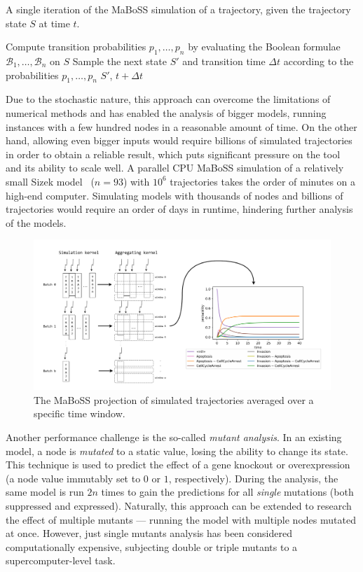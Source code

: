 \begin{algorithm}
    \caption{A single iteration of the MaBoSS simulation of a trajectory, given the trajectory state $S$ at time $t$.}
    \label{alg:iter}
    \begin{algorithmic}[1]
    \State Compute transition probabilities $p_1, \dots, p_n$ by evaluating the Boolean formulae $\mathcal{B}_1, \dots, \mathcal{B}_n$ on $S$
    \State Sample the next state $S'$ and transition time $\Delta t$ according to the probabilities $p_1, \dots, p_n$
    \State \Return $S'$, $t + \Delta t$
    \EndProcedure
    \end{algorithmic}
\end{algorithm}

Due to the stochastic nature, this approach can overcome the limitations of numerical methods and has enabled the analysis of bigger models, running instances with a few hundred nodes in a reasonable amount of time. On the other hand, allowing even bigger inputs would require billions of simulated trajectories in order to obtain a reliable result, which puts significant pressure on the tool and its ability to scale well. A parallel CPU MaBoSS simulation of a relatively small Sizek model~\cite{sizek2019boolean} ($n=93$) with $10^6$ trajectories takes the order of minutes on a high-end computer. Simulating models with thousands of nodes and billions of trajectories would require an order of days in runtime, hindering further analysis of the models.

\begin{figure}
    \centering
    \includegraphics[width=\textwidth]{img/mabossg-kernels.pdf}
    \caption{The MaBoSS projection of simulated trajectories averaged over a specific time window.}
    \label{fig:maboss}
\end{figure}

Another performance challenge is the so-called \emph{mutant analysis}. In an existing model, a node is \emph{mutated} to a static value, losing the ability to change its state. This technique is used to predict the effect of a gene knockout or overexpression (a node value immutably set to $0$ or $1$, respectively). During the analysis, the same model is run $2n$ times to gain the predictions for all \emph{single} mutations (both suppressed and expressed). Naturally, this approach can be extended to research the effect of multiple mutants --- running the model with multiple nodes mutated at once. However, just single mutants analysis has been considered computationally expensive, subjecting double or triple mutants to a supercomputer-level task.

